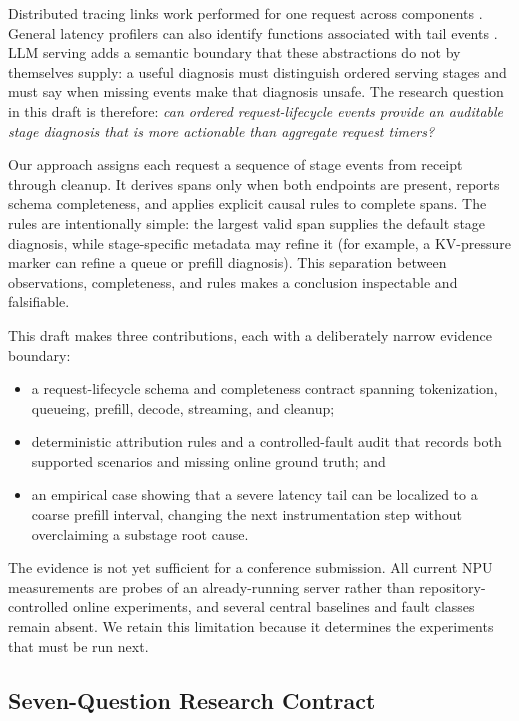 \documentclass[sigconf,screen,nonacm]{acmart}
\begin{document}
Distributed tracing links work performed for one request across components
\cite{dapper2010}. General latency profilers can also identify functions
associated with tail events \cite{ldb2024}. LLM serving adds a semantic
boundary that these abstractions do not by themselves supply: a useful
diagnosis must distinguish ordered serving stages and must say when missing
events make that diagnosis unsafe. The research question in this draft is
therefore: \emph{can ordered request-lifecycle events provide an auditable
stage diagnosis that is more actionable than aggregate request timers?}

Our approach assigns each request a sequence of stage events from receipt
through cleanup. It derives spans only when both endpoints are present, reports
schema completeness, and applies explicit causal rules to complete spans. The
rules are intentionally simple: the largest valid span supplies the default
stage diagnosis, while stage-specific metadata may refine it (for example, a
KV-pressure marker can refine a queue or prefill diagnosis). This separation
between observations, completeness, and rules makes a conclusion inspectable
and falsifiable.

This draft makes three contributions, each with a deliberately narrow evidence
boundary:

\begin{itemize}
  \item a request-lifecycle schema and completeness contract spanning
  tokenization, queueing, prefill, decode, streaming, and cleanup;
  \item deterministic attribution rules and a controlled-fault audit that
  records both supported scenarios and missing online ground truth; and
  \item an empirical case showing that a severe latency tail can be localized
  to a coarse prefill interval, changing the next instrumentation step without
  overclaiming a substage root cause.
\end{itemize}

The evidence is not yet sufficient for a conference submission. All current
NPU measurements are probes of an already-running server rather than
repository-controlled online experiments, and several central baselines and
fault classes remain absent. We retain this limitation because it determines
the experiments that must be run next.

\subsection{Seven-Question Research Contract}
\end{document}
